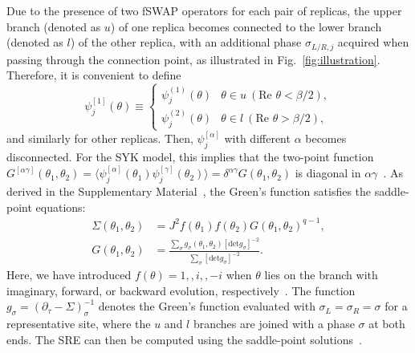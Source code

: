 \documentclass[aps,prl,twocolumn,superscriptaddress,longbibliography]{revtex4-2}
\begin{document}
   Due to the presence of two fSWAP operators for each pair of replicas, the upper branch (denoted as $u$) of one replica becomes connected to the lower branch (denoted as $l$) of the other replica, with an additional phase $\sigma_{L/R,j}$ acquired when passing through the connection point, as illustrated in Fig.~\ref{fig:illustration}. Therefore, it is convenient to define
   \begin{equation}
   \psi_j^{[1]}(\theta)\equiv \begin{cases} \psi_j^{(1)}(\theta) & \theta\in u\ \left(\text{Re~}\theta<\beta/2\right),\\
     \psi_j^{(2)}(\theta)  & \theta\in l\ \left(\text{Re~}\theta>\beta/2\right),
    \end{cases}
   \end{equation}
   and similarly for other replicas. Then, $\psi_j^{[\alpha]}$ with different $\alpha$ becomes disconnected. For the SYK model, this implies that the two-point function $G^{[\alpha\gamma]}(\theta_1,\theta_2)=\langle \psi^{[\alpha]}_j(\theta_1) \psi^{[\gamma]}_j(\theta_2)\rangle=\delta^{\alpha\gamma}G(\theta_1,\theta_2)$ is diagonal in $\alpha\gamma$~\cite{Kitaev:2017awl}. As derived in the Supplementary Material~\cite{SM}, the Green's function satisfies the saddle-point equations:
   \begin{equation}\label{eqn:saddle}
   \begin{aligned}
   \Sigma(\theta_1,\theta_2)&=J^2f(\theta_1)f(\theta_2)G(\theta_1,\theta_2)^{q-1},\\
   G(\theta_1,\theta_2)&=\frac{\sum_\sigma g_\sigma(\theta_1,\theta_2)[\text{det} g_\sigma]^{-2}}{\sum_\sigma [\text{det} g_\sigma]^{-2}}.
   \end{aligned}
   \end{equation}
   Here, we have introduced $f(\theta)=1,, i,,-i$ when $\theta$ lies on the branch with imaginary, forward, or backward evolution, respectively~\cite{Zhang:2020kia,SM}. The function $g_\sigma=(\partial_\tau-\Sigma)^{-1}_\sigma$ denotes the Green’s function evaluated with $\sigma_L=\sigma_R=\sigma$ for a representative site, where the $u$ and $l$ branches are joined with a phase $\sigma$ at both ends. The SRE can then be computed using the saddle-point solutions~\cite{SM}.
\end{document}
